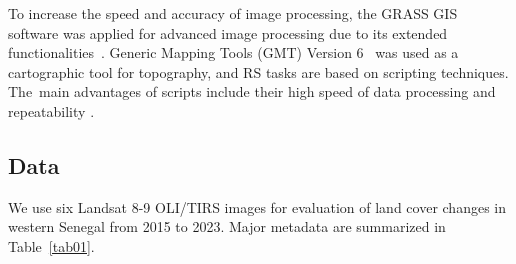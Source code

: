 \documentclass[earth,article,accept,pdftex,moreauthors]{Definitions/mdpi}
\begin{document}
To increase the speed and accuracy of image processing, the{ }GRASS GIS software was applied {for} advanced image processing {due to its extended} functionalities~\cite{Neteleretal2008}. Generic Mapping Tools (GMT) Version 6~\cite{Wessel} {was} used as a cartographic tool for topography, and %
 {RS} {tasks }are based on{ }scripting techniques{. The~}main advantages {of scripts}{ }include{ }their high speed of data processing and repeatability{ }\cite{min13050604,Lemenkova202213,Lemenkova202206}.

\subsection{Data}

We use six Landsat 8-9 OLI/TIRS images for evaluation of land cover changes in western Senegal from 2015 to 2023{. Major metadata are }summarized in Table~\ref{tab01}{.} 
\end{document}
